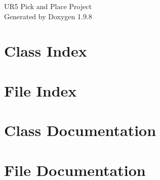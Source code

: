 \documentclass[twoside]{book}
\newcommand{\+}{\discretionary{\mbox{\scriptsize$\hookleftarrow$}}{}{}}
\newcommand{\clearemptydoublepage}{%
    \newpage{\pagestyle{empty}\cleardoublepage}%
  }
\begin{document}
  \raggedbottom
    \hypersetup{pageanchor=false,
                bookmarksnumbered=true,
                pdfencoding=unicode
               }
  \begin{titlepage}
  \vspace*{7cm}
  \begin{center}%
  {\Large UR5 Pick and Place Project}\\
  \vspace*{1cm}
  {\large Generated by Doxygen 1.9.8}\\
  \end{center}
  \end{titlepage}
  \clearemptydoublepage
  \tableofcontents
  \clearemptydoublepage
  \hypersetup{pageanchor=true}


\chapter{Class Index}

\chapter{File Index}

\chapter{Class Documentation}


\chapter{File Documentation}









  \backmatter
  \newpage
  \clearemptydoublepage
  \printindex
\end{document}
